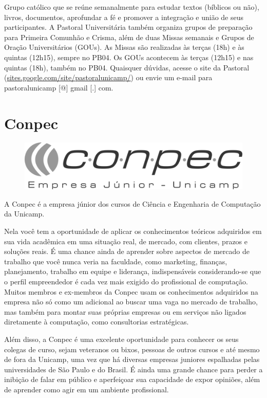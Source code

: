 Grupo católico que se reúne semanalmente para estudar textos (bíblicos ou não),
livros, documentos, aprofundar a fé e promover a integração e união de seus
participantes. A Pastoral Universitária também organiza grupos de preparação
para Primeira Comunhão e Crisma, além de duas Missas semanais e Grupos de Oração
Universitários (GOUs). As Missas são realizadas às terças (18h) e às
quintas (12h15), sempre no PB04. Os GOUs acontecem às terças (12h15) e
nas quintas (18h), também no PB04. Quaisquer dúvidas, acesse o site da
Pastoral (\url{sites.google.com/site/pastoralunicamp/}) ou
envie um e-mail para pastoralunicamp [@] gmail [.] com.

\newpage
\section{Conpec}

\begin{figure}[H]
    \centering
    \includegraphics[scale=0.40]{img/conpec.png}
\end{figure}

A Conpec é a empresa júnior dos cursos de Ciência e Engenharia de Computação da
Unicamp.

Nela você tem a oportunidade de aplicar os conhecimentos teóricos
adquiridos em sua vida acadêmica em uma situação real, de mercado, com clientes,
prazos e soluções reais. É uma chance ainda de aprender sobre aspectos de mercado de trabalho que você
nunca veria na faculdade, como marketing, finanças, planejamento, trabalho em equipe e liderança,
indispensáveis considerando-se que o perfil empreendedor é cada vez mais exigido do profissional de
computação. Muitos membros e ex-membros da Conpec usam os
conhecimentos adquiridos na empresa não só como um adicional ao buscar uma vaga
no mercado de trabalho, mas também para montar suas próprias empresas ou em
serviços não ligados diretamente à computação, como consultorias estratégicas.

Além disso, a Conpec é uma excelente oportunidade para conhecer os seus colegas
de curso, sejam veteranos ou bixos, pessoas de outros cursos e até mesmo de fora da
Unicamp, uma vez que há diversas empresas juniores espalhadas pelas universidades de São Paulo e do Brasil. É ainda uma grande chance para perder a inibição de falar em
público e aperfeiçoar sua capacidade de expor opiniões, além de aprender como
agir em um ambiente profissional.

